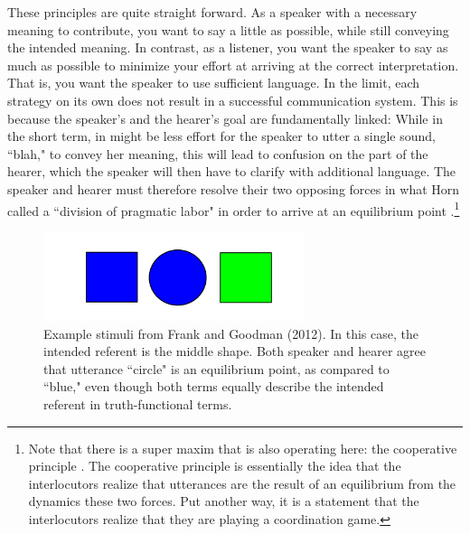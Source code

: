 \documentclass[man, noapacite, 12pt]{apa2}
\begin{document}
These principles are quite straight forward. As a speaker with a necessary meaning to contribute, you want to say a little as possible, while still conveying the intended meaning. In contrast, as a listener, you want the speaker to say as much as possible to minimize your effort at arriving at the correct interpretation. That is, you want the speaker to use sufficient language. In the limit, each strategy on its own does not result in a successful communication system. This is because the speaker's and the hearer's goal are fundamentally linked: While in the short term, in might be less effort for the speaker to utter a single sound, ``blah," to convey her meaning, this will lead to confusion on the part of the hearer, which the speaker will then have to clarify with additional language. The speaker and hearer must therefore resolve their two opposing forces  in what Horn called a ``division of pragmatic labor"  in order to arrive at an equilibrium point \cite[p. 22]{horn1984}.\footnote{Note that there is a super maxim that is also operating here: the cooperative principle \cite{horn1984, grice1975logic}. The cooperative principle is essentially the idea that the interlocutors realize that utterances are the result of an equilibrium from the dynamics these two forces. Put another way, it is a statement that the interlocutors realize that they are playing a coordination game.}

\begin{figure}
\begin{center} 
\includegraphics[width=3in]{figs/frank2012.png}
\caption{\label{fig:frank2012}  Example stimuli from Frank and Goodman (2012). In this case, the intended referent is the middle shape. Both speaker and hearer agree that utterance ``circle" is  an equilibrium point, as compared to ``blue," even though both terms equally describe the intended referent in truth-functional terms.}
\end{center} 
\end{figure}
\end{document}
